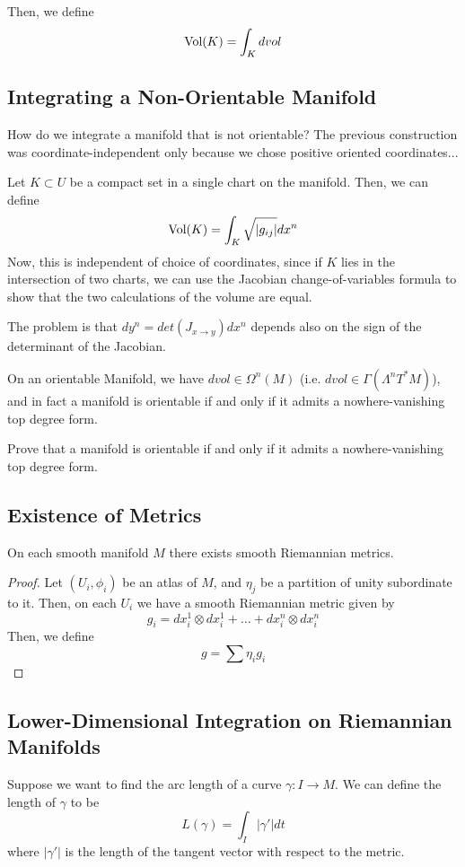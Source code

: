 \documentclass[../main.tex]{subfiles}
\begin{document}
Then, we define
\[
    \textrm{Vol}(K) = \int_Kdvol
\]

\subsection{Integrating a Non-Orientable Manifold}
How do we integrate a manifold that is not orientable? The previous construction
was coordinate-independent only because we chose positive oriented
coordinates...

Let $K\subset U$ be a compact set in a single chart on the manifold. Then, we
can define
\[
    \textrm{Vol}(K) = \int_K\sqrt{|g_{ij}|}dx^n
\]
Now, this is independent of choice of coordinates, since if $K$ lies in the
intersection of two charts, we can use the Jacobian change-of-variables formula
to show that the two calculations of the volume are equal.

The problem is that $dy^n = det(J_{x\to y})dx^n$ depends also on the sign of
the determinant of the Jacobian.

On an orientable Manifold, we have $dvol\in \Omega^n(M)$ (i.e.
$dvol\in\Gamma(\Lambda^nT^*M)$), and in fact a manifold is orientable if and
only if it admits a nowhere-vanishing top degree form.
\begin{hw}
    Prove that a manifold is orientable if and only if it admits a
    nowhere-vanishing top degree form.
\end{hw}

\subsection{Existence of Metrics}

\begin{theorem}
    On each smooth manifold $M$ there exists smooth Riemannian metrics.
\end{theorem}

\begin{proof}
    Let $(U_i,\phi_i)$ be an atlas of $M$, and $\eta_j$ be a partition of unity
    subordinate to it.
    Then, on each $U_i$ we have a smooth Riemannian metric given by
    \[
        g_i = dx_i^1\otimes dx_i^1+\ldots+dx_i^n\otimes dx_i^n
    \]
    Then, we define
    \[
        g = \sum\eta_ig_i
    \]
\end{proof}

\subsection{Lower-Dimensional Integration on Riemannian Manifolds}
Suppose we want to find the arc length of a curve $\gamma:I\to M$. We can define
the length of $\gamma$ to be
\[
    L(\gamma) = \int_I|\gamma'|dt
\]
where $|\gamma'|$ is the length of the tangent vector with respect to the
metric.
\end{document}
